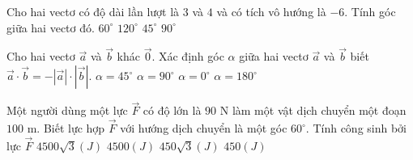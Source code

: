 \begin{ex}%
	Cho hai vectơ có độ dài lần lượt là $3$ và $4$ và có tích vô hướng là $-6$. Tính góc giữa hai vectơ đó.
	\choice
	{$60^\circ$}
	{$120^\circ$}
	{\True $45^\circ$}
	{$90^\circ$}
\end{ex}

\begin{ex}%
	Cho hai vectơ $\overrightarrow{a}$ và $\overrightarrow{b}$ khác $\overrightarrow{0}$. Xác định góc $\alpha $ giữa hai vectơ $\overrightarrow{a}$ và $\overrightarrow{b}$ biết $\overrightarrow{a}\cdot\overrightarrow{b}=-\left| \overrightarrow{a} \right|\cdot\left| \overrightarrow{b} \right|$.
	\choice
	{$\alpha =45^{\circ}$}
	{$\alpha =90^{\circ}$}
	{$\alpha =0^{\circ}$}
	{\True $\alpha =180^{\circ}$}
\end{ex}

\begin{ex}%
	Một người dùng một lực $\vec{F}$ có độ lớn là $90$ N làm một vật dịch chuyển một đoạn $100 $ m. Biết lực hợp $\vec{F}$ với hướng dịch chuyển là một góc $60^{\circ}$. Tính công sinh bởi lực $\vec{F}$
	\choice
	{$4500\sqrt{3}(J)$}
	{\True $4500(J)$}
	{$450\sqrt{3}(J)$}
	{$450(J)$}
\end{ex}

